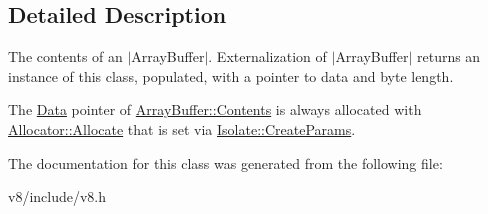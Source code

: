 \subsection{Detailed Description}
The contents of an $\vert$\+Array\+Buffer$\vert$. Externalization of $\vert$\+Array\+Buffer$\vert$ returns an instance of this class, populated, with a pointer to data and byte length.

The \mbox{\hyperlink{classv8_1_1Data}{Data}} pointer of \mbox{\hyperlink{classv8_1_1ArrayBuffer_1_1Contents}{Array\+Buffer\+::\+Contents}} is always allocated with \mbox{\hyperlink{classv8_1_1ArrayBuffer_1_1Allocator_a106b0d80120ed04fe9b9675e96f0340b}{Allocator\+::\+Allocate}} that is set via \mbox{\hyperlink{structv8_1_1Isolate_1_1CreateParams}{Isolate\+::\+Create\+Params}}. 

The documentation for this class was generated from the following file\+:\begin{DoxyCompactItemize}
\item 
v8/include/v8.\+h\end{DoxyCompactItemize}
